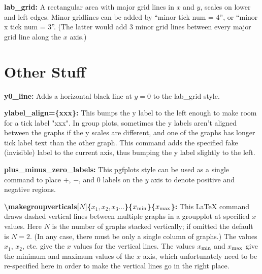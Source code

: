 \documentclass{article}
\begin{document}
\textbf{lab\_grid:} A rectangular area with major grid lines in $x$ and $y$, scales on lower and left edges.  Minor gridlines can be added by ``minor tick num = 4'', or ``minor x tick num = 3''.  (The latter would add 3 minor grid lines between every major grid line along the $x$ axis.)

\section{Other Stuff}

\textbf{y0\_line:} Adds a horizontal black line at $y=0$ to the lab\_grid style.

\textbf{ylabel\_align=\{xxx\}:} This bumps the y label to the left enough to make room for a tick label "xxx".  In group plots, sometimes the y labels aren't aligned between the graphs if the y scales are different, and one of the graphs
has longer tick label text than the other graph.  This command adds the specified fake (invisible) label to the 
current axis, thus bumping the y label slightly to the left.

\textbf{plus\_minus\_zero\_labels:} This pgfplots style can be used as a single command to place $+$, $-$, and $0$ labels on the $y$ axis to denote positive and negative regions.

\textbf{\textbackslash makegroupverticals[$N$]\{$x_1, x_2, x_3...$\}\{$x_{\rm min}$\}\{$x_{\rm max}$\}:} This LaTeX command draws dashed vertical lines between multiple graphs in a groupplot at specified $x$ values.  Here $N$ is the number of graphs stacked vertically; if omitted the default is $N=2$. (In any case, there must be only a single column of graphs.)  The values $x_1$, $x_2$, etc. give the $x$ values for the vertical lines.  The values $x_{\rm min}$ and $x_{\rm max}$ give the minimum and maximum values of the $x$ axis, which unfortunately need to be re-specified here in order to make the vertical lines go in the right place.
\end{document}

